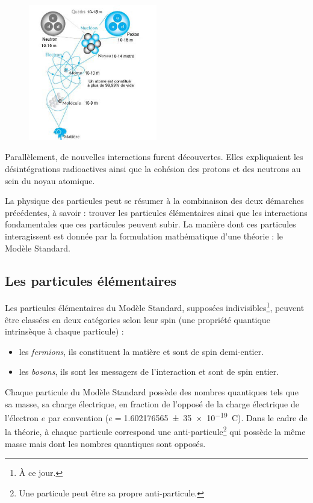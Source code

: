 \vspace*{-0.5cm}
\begin{figure}[ht!]
\centering
\includegraphics[width=0.50\textwidth]{SM/structure.jpg}
\label{structure}
\end{figure}

\vspace*{-0.5cm}
Parallèlement, de nouvelles interactions furent découvertes. Elles expliquaient les désintégrations radioactives ainsi que la cohésion des protons et des neutrons au sein du noyau atomique.

La physique des particules peut se résumer à la combinaison des deux démarches précédentes, à savoir : trouver les particules élémentaires ainsi que les interactions fondamentales que ces particules peuvent subir. La manière dont ces particules interagissent est donnée par la formulation mathématique d'une théorie : le Modèle Standard.

\subsection{Les particules élémentaires}
Les particules élémentaires du Modèle Standard, supposées indivisibles\footnote{À ce jour.}, peuvent être classées en deux catégories selon leur spin (une propriété quantique intrinsèque à chaque particule) :
\begin{itemize}[label=$\bullet$]
\item les \textit{fermions}, ils constituent la matière et sont de spin demi-entier.
\item les \textit{bosons}, ils sont les messagers de l'interaction et sont de spin entier.
\end{itemize}
Chaque particule du Modèle Standard possède des nombres quantiques tels que sa masse, sa charge électrique, en fraction de l'opposé de la charge électrique de l'électron $e$ par convention ($e=$\SI{1.602 176 565(35)e-19}{\coulomb}). Dans le cadre de la théorie, à chaque particule correspond une anti-particule\footnote{Une particule peut être sa propre anti-particule.} qui possède la même masse mais dont les nombres quantiques sont opposés.

